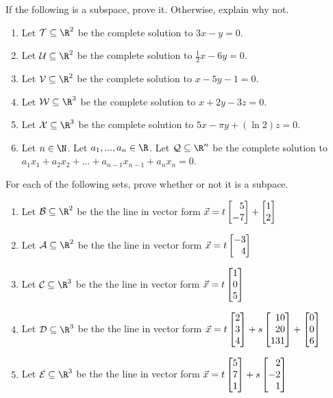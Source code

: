 \begin{exercises}
	\begin{problist}

		\prob If the following is a subspace, prove it. Otherwise, explain why not.
		\begin{enumerate}
			\item Let $\mathcal T \subseteq \R^2$ be the complete solution to $3x-y=0$.
			\item Let $\mathcal U \subseteq \R^2$ be the complete solution to $\frac{1}{2}x-6y=0$.
			\item Let $\mathcal V \subseteq \R^2$ be the complete solution to $x-5y-1=0$.
			\item Let $\mathcal W \subseteq \R^3$ be the complete solution to $x+2y-3z=0$.
			\item Let $\mathcal X \subseteq \R^3$ be the complete solution to
			$5x-\pi y + (\ln 2)z=0$.
			\item Let $n \in \N$. Let $a_1,...,a_n \in \R$. Let $\mathcal Q \subseteq \R^n$ be the complete solution to $a_1x_1+a_2x_2+...+a_{n-1}x_{n-1}+a_nx_n=0$.
		\end{enumerate}

		\prob For each of the following sets, prove whether or not it is a subpace.
		\begin{enumerate}
			\item Let $\mathcal B \subseteq \R^2$ be the the line in vector form
			$\vec x = t\mat{5\\-7}+\mat{1\\2}$
			\item Let $\mathcal A \subseteq \R^2$ be the the line in vector form
			$\vec x = t\mat{-3\\4}$
			\item Let $\mathcal C \subseteq \R^3$ be the the line in vector form
			$\vec x = t\mat{1\\0\\5}$
			\item Let $\mathcal D \subseteq \R^3$ be the the line in vector form
			$\vec x = t\mat{2\\3\\4}+s\mat{10\\20\\131}+\mat{0\\0\\6}$
			\item Let $\mathcal E \subseteq \R^3$ be the the line in vector form
			$\vec x = t\mat{5\\7\\1}+s\mat{2\\-2\\1}$
		\end{enumerate}


\end{problist}
\end{exercises}
